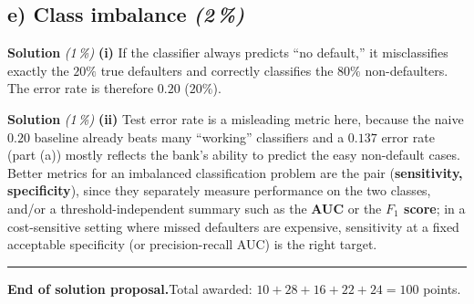 \documentclass[11pt,a4paper]{article}
\newcommand{\subpoints}[1]{\textit{(#1\,\%)}}
\newcommand{\sol}{\noindent\textbf{Solution}}
\begin{document}
\subsection*{e) Class imbalance \subpoints{2}}

\sol{} \subpoints{1} \textbf{(i)} If the classifier always predicts ``no default,'' it misclassifies
exactly the $20\%$ true defaulters and correctly classifies the $80\%$ non-defaulters. The error
rate is therefore $\boxed{0.20}$ ($20\%$).

\medskip
\sol{} \subpoints{1} \textbf{(ii)} Test error rate is a misleading metric here, because the naive
$0.20$ baseline already beats many ``working'' classifiers and a $0.137$ error rate (part (a))
mostly reflects the bank's ability to predict the easy non-default cases. Better metrics for an
imbalanced classification problem are the pair (\textbf{sensitivity, specificity}), since they
separately measure performance on the two classes, and/or a threshold-independent summary such as
the \textbf{AUC} or the \textbf{$F_1$ score}; in a cost-sensitive setting where missed defaulters
are expensive, sensitivity at a fixed acceptable specificity (or precision-recall AUC) is the
right target.

\vspace{1em}
\hrule
\vspace{0.5em}

\noindent\textbf{End of solution proposal.}\quad Total awarded: $10+28+16+22+24=100$ points.
\end{document}
